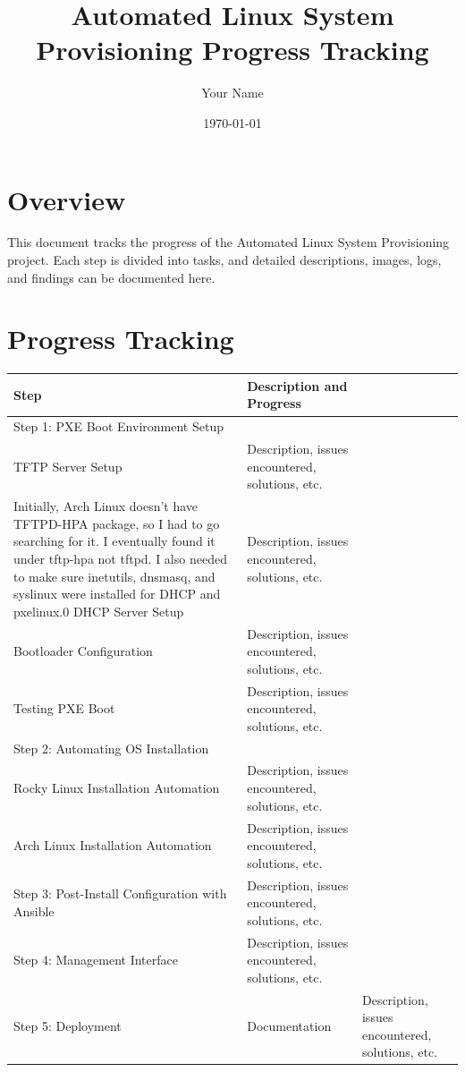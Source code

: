 \documentclass{article}
\title{Automated Linux System Provisioning Progress Tracking}
\author{Your Name}
\date{\today}
\begin{document}
\maketitle

\section*{Overview}
This document tracks the progress of the Automated Linux System Provisioning project. Each step is divided into tasks, and detailed descriptions, images, logs, and findings can be documented here.

\section*{Progress Tracking}

\begin{longtable}{|p{4cm}|p{10cm}|}
\hline
\textbf{Step} & \textbf{Description and Progress} \\
\hline
Step 1: PXE Boot Environment Setup & \\ \hline
TFTP Server Setup & Description, issues encountered, solutions, etc. \\ \hline
Initially, Arch Linux doesn't have TFTPD-HPA package, so I had to go searching for it.
I eventually found it under  tftp-hpa not tftpd.
I also needed to make sure inetutils, dnsmasq, and syslinux were installed for DHCP and pxelinux.0
DHCP Server Setup & Description, issues encountered, solutions, etc. \\ \hline
Bootloader Configuration & Description, issues encountered, solutions, etc. \\ \hline
Testing PXE Boot & Description, issues encountered, solutions, etc. \\ \hline
Step 2: Automating OS Installation & \\ \hline
Rocky Linux Installation Automation & Description, issues encountered, solutions, etc. \\ \hline
Arch Linux Installation Automation & Description, issues encountered, solutions, etc. \\ \hline
Step 3: Post-Install Configuration with Ansible & Description, issues encountered, solutions, etc. \\ \hline
Step 4: Management Interface & Description, issues encountered, solutions, etc. \\ \hline
Step 5: Deployment & Documentation & Description, issues encountered, solutions, etc. \\ \hline
\end{longtable}
\end{document}
